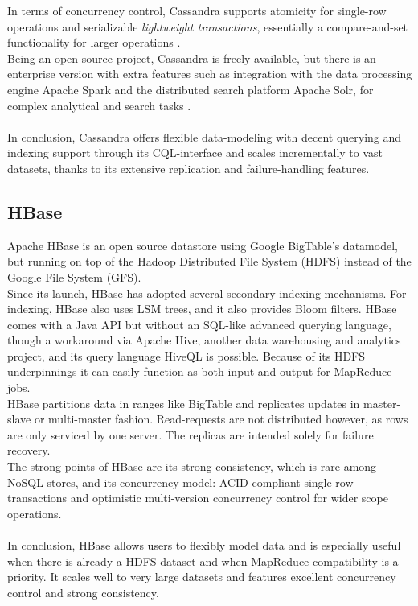 \documentclass{IEEEtran}
\begin{document}
In terms of concurrency control, Cassandra supports atomicity for single-row operations and serializable \textit{lightweight transactions}, essentially a compare-and-set functionality for larger operations \cite{cassandra_lightweight_trans}.\\
Being an open-source project, Cassandra is freely available, but there is an enterprise version with extra features such as integration with the data processing engine Apache Spark and the distributed search platform Apache Solr, for complex analytical and search tasks \cite{cassandra_solr} \cite{cassandra_spark} \cite{zaharia2010spark}\cite{apache_solr}.\\\\
In conclusion, Cassandra offers flexible data-modeling with decent querying and indexing support through its CQL-interface and scales incrementally to vast datasets, thanks to its extensive replication and failure-handling features.

\subsection{HBase}

Apache HBase is an open source datastore using Google BigTable's datamodel, but running on top of the Hadoop Distributed File System (HDFS) instead of the Google File System (GFS).
\\Since its launch, HBase has adopted several secondary indexing mechanisms. For indexing, HBase also uses LSM trees\cite{borthakur2011apache}\cite{sears2012blsm}, and it also provides Bloom filters\cite{hbase_schema}. HBase comes with a Java API but without an SQL-like advanced querying language, though a workaround via Apache Hive, another data warehousing and analytics project\cite{apache_hive}, and its query language HiveQL is possible. Because of its HDFS underpinnings it can easily function as both input and output for MapReduce jobs.
\\HBase partitions data in ranges like BigTable and replicates updates in master-slave or multi-master fashion. Read-requests are not distributed however, as rows are only serviced by one server. The replicas are intended solely for failure recovery.
\\The strong points of HBase are its strong consistency, which is rare among NoSQL-stores, and its concurrency model: ACID-compliant single row transactions and optimistic multi-version concurrency control for wider scope operations\cite{hbase_acid}\cite{grolinger2013data}\cite{borthakur2011apache}.\\\\
In conclusion, HBase allows users to flexibly model data and is especially useful when there is already a HDFS dataset and when MapReduce compatibility is a priority. It scales well to very large datasets and features excellent concurrency control and strong consistency.
\end{document}
